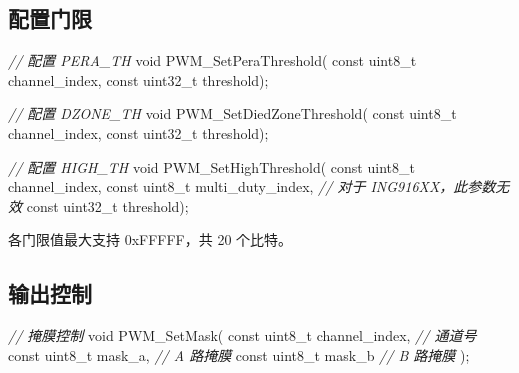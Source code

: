 \documentclass[
  12pt,
]{book}
\newenvironment{Shaded}{\begin{snugshade}}{\end{snugshade}}
\newcommand{\CommentTok}[1]{\textcolor[rgb]{0.56,0.35,0.01}{\textit{#1}}}
\newcommand{\DataTypeTok}[1]{\textcolor[rgb]{0.13,0.29,0.53}{#1}}
\newcommand{\NormalTok}[1]{#1}
\begin{document}
\hypertarget{ux914dux7f6eux95e8ux9650}{%
\subsection{配置门限}\label{ux914dux7f6eux95e8ux9650}}

\begin{Shaded}
\begin{Highlighting}[]
\CommentTok{// 配置 PERA_TH}
\DataTypeTok{void}\NormalTok{ PWM_SetPeraThreshold(}
    \DataTypeTok{const} \DataTypeTok{uint8_t}\NormalTok{ channel_index,}
    \DataTypeTok{const} \DataTypeTok{uint32_t}\NormalTok{ threshold);}
\end{Highlighting}
\end{Shaded}

\begin{Shaded}
\begin{Highlighting}[]
\CommentTok{// 配置 DZONE_TH}
\DataTypeTok{void}\NormalTok{ PWM_SetDiedZoneThreshold(}
    \DataTypeTok{const} \DataTypeTok{uint8_t}\NormalTok{ channel_index,}
    \DataTypeTok{const} \DataTypeTok{uint32_t}\NormalTok{ threshold);}
\end{Highlighting}
\end{Shaded}

\begin{Shaded}
\begin{Highlighting}[]
\CommentTok{// 配置 HIGH_TH}
\DataTypeTok{void}\NormalTok{ PWM_SetHighThreshold(}
    \DataTypeTok{const} \DataTypeTok{uint8_t}\NormalTok{ channel_index,}
    \DataTypeTok{const} \DataTypeTok{uint8_t}\NormalTok{ multi_duty_index, }\CommentTok{// 对于 ING916XX，此参数无效}
    \DataTypeTok{const} \DataTypeTok{uint32_t}\NormalTok{ threshold);}
\end{Highlighting}
\end{Shaded}

各门限值最大支持 0xFFFFF，共 20 个比特。

\hypertarget{ux8f93ux51faux63a7ux5236-1}{%
\subsection{输出控制}\label{ux8f93ux51faux63a7ux5236-1}}

\begin{Shaded}
\begin{Highlighting}[]
\CommentTok{// 掩膜控制}
\DataTypeTok{void}\NormalTok{ PWM_SetMask(}
    \DataTypeTok{const} \DataTypeTok{uint8_t}\NormalTok{ channel_index,    }\CommentTok{// 通道号}
    \DataTypeTok{const} \DataTypeTok{uint8_t}\NormalTok{ mask_a,           }\CommentTok{// A 路掩膜}
    \DataTypeTok{const} \DataTypeTok{uint8_t}\NormalTok{ mask_b            }\CommentTok{// B 路掩膜}
\NormalTok{    );}
\end{Highlighting}
\end{Shaded}
\end{document}
